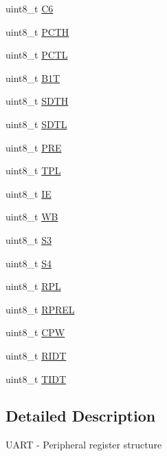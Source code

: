 \begin{DoxyCompactItemize}
\item 
uint8\+\_\+t \hyperlink{struct_u_a_r_t___mem_map_ac23c9991a1c144df8b3029e46e1a0c99}{C6}
\item 
uint8\+\_\+t \hyperlink{struct_u_a_r_t___mem_map_a0904d07dd04480437976c762855eea35}{P\+C\+T\+H}
\item 
uint8\+\_\+t \hyperlink{struct_u_a_r_t___mem_map_ab238ef6c9d2d68fb2d905ee901e63717}{P\+C\+T\+L}
\item 
uint8\+\_\+t \hyperlink{struct_u_a_r_t___mem_map_aea11cf4a0a5b167335d2ce4a23d488c7}{B1\+T}
\item 
uint8\+\_\+t \hyperlink{struct_u_a_r_t___mem_map_ace3766dcf2abe24be7b96e83348bb07f}{S\+D\+T\+H}
\item 
uint8\+\_\+t \hyperlink{struct_u_a_r_t___mem_map_a3b5758c5c5e69ce53c96f4f22c68eeb4}{S\+D\+T\+L}
\item 
uint8\+\_\+t \hyperlink{struct_u_a_r_t___mem_map_ae81ff2b0a74594984022da3767a66b20}{P\+R\+E}
\item 
uint8\+\_\+t \hyperlink{struct_u_a_r_t___mem_map_aaef0682db07857a89bbc31b6436126cd}{T\+P\+L}
\item 
uint8\+\_\+t \hyperlink{struct_u_a_r_t___mem_map_a2afbf716d5118bddf32eb285fbb15460}{I\+E}
\item 
uint8\+\_\+t \hyperlink{struct_u_a_r_t___mem_map_a43388b5bf30b9bf24297057d30ac0596}{W\+B}
\item 
uint8\+\_\+t \hyperlink{struct_u_a_r_t___mem_map_a3aa12aba05d8d4c73c27c316a0f422cc}{S3}
\item 
uint8\+\_\+t \hyperlink{struct_u_a_r_t___mem_map_a94722c3f3c663800fc6178ac9f24049b}{S4}
\item 
uint8\+\_\+t \hyperlink{struct_u_a_r_t___mem_map_ad9124bf6041c389a9e13aee5953aa6f6}{R\+P\+L}
\item 
uint8\+\_\+t \hyperlink{struct_u_a_r_t___mem_map_a30a3dfe8a84c49980087e5b1e5442001}{R\+P\+R\+E\+L}
\item 
uint8\+\_\+t \hyperlink{struct_u_a_r_t___mem_map_aadd1a3fac140047bd8625a4d8fe5a512}{C\+P\+W}
\item 
uint8\+\_\+t \hyperlink{struct_u_a_r_t___mem_map_a741dca013188d8a9bd49fed8277b4cbd}{R\+I\+D\+T}
\item 
uint8\+\_\+t \hyperlink{struct_u_a_r_t___mem_map_a26263655b9382b2ecd3d86954b36aaed}{T\+I\+D\+T}
\end{DoxyCompactItemize}


\subsection{Detailed Description}
U\+A\+R\+T -\/ Peripheral register structure 

